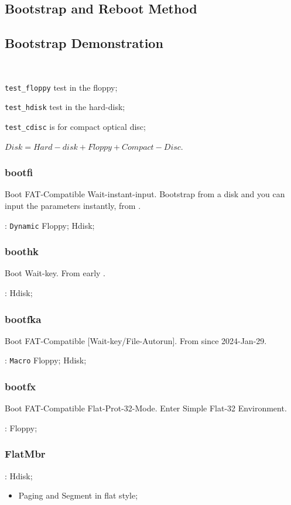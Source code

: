 \subsection{Bootstrap and Reboot Method}


\subsection{Bootstrap Demonstration} \

\verb`test_floppy` test in the floppy;

\verb`test_hdisk` test in the hard-disk;

\verb`test_cdisc` is  for compact optical disc;

$Disk = Hard-disk + Floppy + Compact-Disc$.

\subsubsection{bootfi}

Boot FAT-Compatible Wait-instant-input. Bootstrap from a disk and you can input the parameters instantly, from .

: \verb|Dynamic| Floppy; Hdisk;

\subsubsection{boothk} %

Boot Wait-key. From early .

: Hdisk;

\subsubsection{bootfka}

Boot FAT-Compatible [Wait-key/File-Autorun]. From  since 2024-Jan-29.

: \verb`Macro` Floppy; Hdisk;

\subsubsection{bootfx}

Boot FAT-Compatible Flat-Prot-32-Mode. Enter Simple Flat-32 Environment.

: Floppy;

\subsubsection{FlatMbr}%


: Hdisk;

\begin{itemize}
	\item Paging and Segment in flat style;
\end{itemize}
